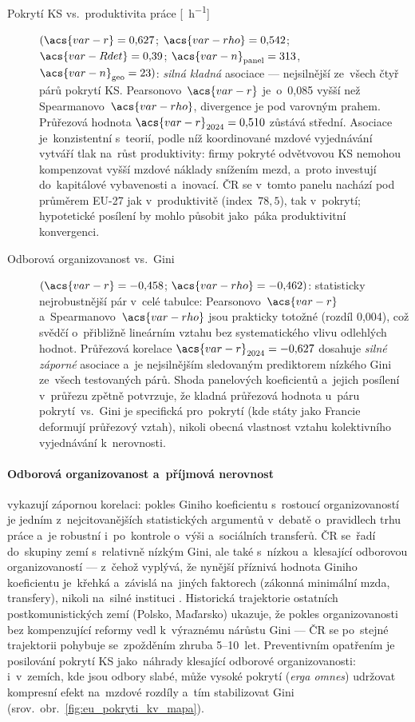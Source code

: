 \begin{description}
  \item[Pokrytí \acs{KS} vs.\ produktivita práce
    {[\si{\pps\per\hour}]}] $(\acs{var-r}=0{,}627$; $\acs{var-rho}=0{,}542$;
    $\acs{var-Rdet}=0{,}39$; $\acs{var-n}_{\text{panel}}=313$,
    $\acs{var-n}_{\text{geo}}=23)$: \emph{silná kladná} asociace --- nejsilnější
    ze~všech čtyř párů pokrytí \acs{KS}. Pearsonovo~$\acs{var-r}$ je~o~0,085 vyšší
    než Spearmanovo~$\acs{var-rho}$, divergence je pod varovným prahem.
    Průřezová hodnota $\acs{var-r}_{2024}=0{,}510$ zůstává střední. Asociace
    je~konzistentní s~teorií, podle níž koordinované mzdové vyjednávání
    vytváří tlak na~růst produktivity: firmy pokryté odvětvovou \acs{KS}
    nemohou kompenzovat vyšší mzdové náklady snížením mezd, a~proto investují
    do~kapitálové vybavenosti a~inovací. \Ac{ČR} se v~tomto panelu nachází pod průměrem
    EU-27 jak v~produktivitě (index~$78{,}5$), tak v~pokrytí; hypotetické
    posílení  by mohlo působit jako~páka produktivitní
    konvergenci.

  \item[Odborová organizovanost vs.\ Gini] $(\acs{var-r}=-0{,}458$; $\acs{var-rho}=-0{,}462)$:
    statisticky nejrobustnější pár v~celé tabulce: Pearsonovo~$\acs{var-r}$
    a~Spearmanovo~$\acs{var-rho}$ jsou prakticky totožné (rozdíl 0,004), což
    svědčí o~přibližně lineárním vztahu bez systematického vlivu odlehlých
    hodnot. Průřezová korelace $\acs{var-r}_{2024}=-0{,}627$ dosahuje
    \emph{silné záporné} asociace a~je nejsilnějším sledovaným
    prediktorem nízkého Gini ze~všech testovaných párů. Shoda panelových
    koeficientů a~jejich posílení v~průřezu zpětně potvrzuje, že kladná
    průřezová hodnota u~páru pokrytí~vs.~Gini je specifická pro~pokrytí
    (kde státy jako Francie deformují průřezový vztah), nikoli obecná
    vlastnost vztahu kolektivního vyjednávání k~nerovnosti.
\end{description}

\paragraph{Odborová organizovanost a~příjmová nerovnost}\label{par:union_gini} vykazují zápornou korelaci: pokles Giniho koeficientu s~rostoucí
organizovaností je jedním z~nejcitovanějších statistických argumentů v~debatě
o~pravidlech trhu práce a~je robustní i~po~kontrole
o~výši  a~sociálních transferů. \Ac{ČR} se~řadí
do~skupiny zemí s~relativně nízkým Gini, ale také s~nízkou a~klesající
odborovou organizovaností --- z~čehož vyplývá, že nynější příznivá hodnota Giniho
koeficientu je~křehká a~závislá na~jiných faktorech (zákonná minimální mzda,
transfery), nikoli na~silné instituci . Historická trajektorie
ostatních postkomunistických zemí (Polsko, Maďarsko) ukazuje, že pokles
organizovanosti bez kompenzující reformy  vedl k~výraznému nárůstu Gini ---
\Ac{ČR} se po~stejné trajektorii pohybuje se~zpožděním zhruba 5--10~let.
Preventivním opatřením je posilování pokrytí \acs{KS} jako~náhrady klesající
odborové organizovanosti: i~v~zemích, kde jsou odbory slabé, může vysoké pokrytí
 (\textit{erga omnes}) udržovat kompresní efekt na~mzdové rozdíly
a~tím stabilizovat Gini (srov.\ obr.~\ref{fig:eu_pokryti_kv_mapa}).

